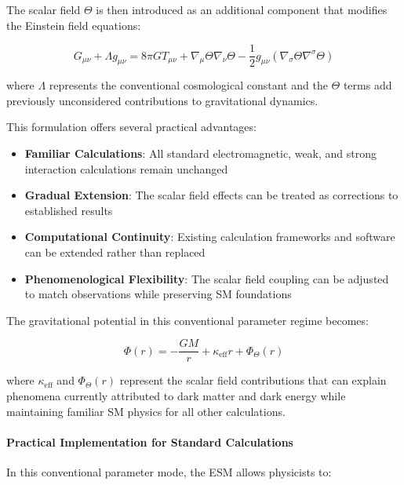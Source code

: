 	The scalar field $\Theta$ is then introduced as an additional component that modifies the Einstein field equations:
	
	\begin{equation}
		G_{\mu\nu} + \Lambda g_{\mu\nu} = 8\pi G T_{\mu\nu} + \nabla_{\mu}\Theta\nabla_{\nu}\Theta - \frac{1}{2}g_{\mu\nu}(\nabla_{\sigma}\Theta\nabla^{\sigma}\Theta)
	\end{equation}
	
	where $\Lambda$ represents the conventional cosmological constant and the $\Theta$ terms add previously unconsidered contributions to gravitational dynamics.
	
	This formulation offers several practical advantages:
	
	\begin{itemize}
		\item \textbf{Familiar Calculations}: All standard electromagnetic, weak, and strong interaction calculations remain unchanged
		\item \textbf{Gradual Extension}: The scalar field effects can be treated as corrections to established results
		\item \textbf{Computational Continuity}: Existing calculation frameworks and software can be extended rather than replaced
		\item \textbf{Phenomenological Flexibility}: The scalar field coupling can be adjusted to match observations while preserving SM foundations
	\end{itemize}
	
	The gravitational potential in this conventional parameter regime becomes:
	
	\begin{equation}
		\Phi(r) = -\frac{GM}{r} + \kappa_{\text{eff}} r + \Phi_{\Theta}(r)
	\end{equation}
	
	where $\kappa_{\text{eff}}$ and $\Phi_{\Theta}(r)$ represent the scalar field contributions that can explain phenomena currently attributed to dark matter and dark energy while maintaining familiar SM physics for all other calculations.
	
	\paragraph{Practical Implementation for Standard Calculations}
	\label{par:practical_implementation}
	
	In this conventional parameter mode, the ESM allows physicists to:
	
